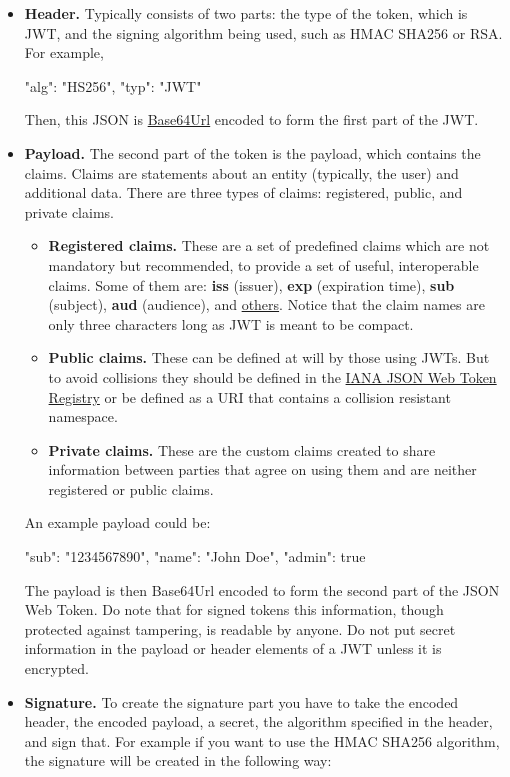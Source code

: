 \begin{itemize}
    \item \textbf{Header.} Typically consists of two parts: the type of the token, which is JWT, and the signing algorithm
    being used, such as HMAC SHA256 or RSA\@.
    For example,

    \begin{spverbatim}
    {
        "alg": "HS256",
        "typ": "JWT"
    }
    \end{spverbatim}

    Then, this JSON is \href{https://en.wikipedia.org/wiki/Base64}{Base64Url} encoded to form the first part of the JWT\@.
    \item \textbf{Payload.} The second part of the token is the payload, which contains the claims.
    Claims are statements about an entity (typically, the user) and additional data.
    There are three types of claims: registered, public, and private claims.
    \begin{itemize}
        \item \textbf{Registered claims.} These are a set of predefined claims which are not mandatory but recommended,
        to provide a set of useful, interoperable claims.
        Some of them are: \textbf{iss} (issuer), \textbf{exp} (expiration time), \textbf{sub} (subject),
        \textbf{aud} (audience), and \href{https://tools.ietf.org/html/rfc7519#section-4.1}{others}.
        Notice that the claim names are only three characters long as JWT is meant to be compact.
        \item \textbf{Public claims.} These can be defined at will by those using JWTs. But to avoid collisions they
        should be defined in the \href{https://www.iana.org/assignments/jwt/jwt.xhtml}{IANA JSON Web Token Registry}
        or be defined as a URI that contains a collision resistant namespace.
        \item \textbf{Private claims.} These are the custom claims created to share information between parties that
        agree on using them and are neither registered or public claims.
    \end{itemize}
    An example payload could be:

    \begin{spverbatim}
    {
        "sub": "1234567890",
        "name": "John Doe",
        "admin": true
    }
    \end{spverbatim}

    The payload is then Base64Url encoded to form the second part of the JSON Web Token.
    Do note that for signed tokens this information, though protected against tampering, is readable by anyone.
    Do not put secret information in the payload or header elements of a JWT unless it is encrypted.
    \item \textbf{Signature.} To create the signature part you have to take the encoded header, the encoded payload, a secret,
    the algorithm specified in the header, and sign that.
    For example if you want to use the HMAC SHA256 algorithm, the signature will be created in the following way:


\end{itemize}
